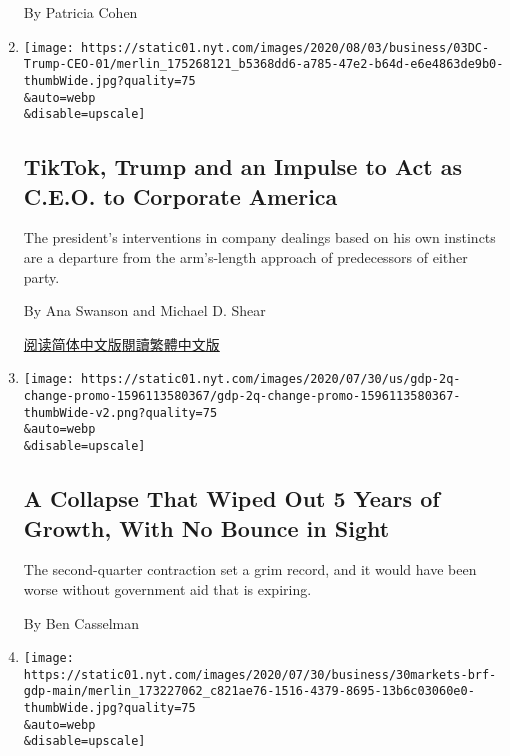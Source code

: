\begin{enumerate}
  By Patricia Cohen
\item
  \href{/2020/08/03/business/economy/trump-tiktok-china-business.html}{}

  \texttt{[image: https://static01.nyt.com/images/2020/08/03/business/03DC-Trump-CEO-01/merlin\_175268121\_b5368dd6-a785-47e2-b64d-e6e4863de9b0-thumbWide.jpg?quality=75\\\&auto=webp\\\&disable=upscale]}

  \hypertarget{tiktok-trump-and-an-impulse-to-act-as-ceo-to-corporate-america}{%
  \subsection{TikTok, Trump and an Impulse to Act as C.E.O. to Corporate
  America}\label{tiktok-trump-and-an-impulse-to-act-as-ceo-to-corporate-america}}

  The president's interventions in company dealings based on his own
  instincts are a departure from the arm's-length approach of
  predecessors of either party.

  By Ana Swanson and Michael D. Shear

  \href{https://cn.nytimes.com/business/20200804/trump-tiktok-china-business/}{阅读简体中文版}\href{https://cn.nytimes.com/business/20200804/trump-tiktok-china-business/zh-hant/}{閱讀繁體中文版}
\item
  \href{/2020/07/30/business/economy/q2-gdp-coronavirus-economy.html}{}

  \texttt{[image: https://static01.nyt.com/images/2020/07/30/us/gdp-2q-change-promo-1596113580367/gdp-2q-change-promo-1596113580367-thumbWide-v2.png?quality=75\\\&auto=webp\\\&disable=upscale]}

  \hypertarget{a-collapse-that-wiped-out-5-years-of-growth-with-no-bounce-in-sight}{%
  \subsection{A Collapse That Wiped Out 5 Years of Growth, With No
  Bounce in
  Sight}\label{a-collapse-that-wiped-out-5-years-of-growth-with-no-bounce-in-sight}}

  The second-quarter contraction set a grim record, and it would have
  been worse without government aid that is expiring.

  By Ben Casselman
\item
  \href{/2020/07/30/business/californias-setbacks-in-reopening-could-burden-the-us-economy.html}{}

  \texttt{[image: https://static01.nyt.com/images/2020/07/30/business/30markets-brf-gdp-main/merlin\_173227062\_c821ae76-1516-4379-8695-13b6c03060e0-thumbWide.jpg?quality=75\\\&auto=webp\\\&disable=upscale]}


\end{enumerate}
